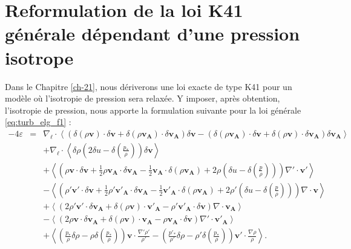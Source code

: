 \section{Reformulation de la loi \acs{K41} générale dépendant d'une pression isotrope}
\label{sec-132}

Dans le Chapitre \ref{ch-21}, nous dériverons une loi exacte de type \acs{K41} pour un modèle où l'isotropie de pression sera relaxée. Y imposer, après obtention, l'isotropie de pression, nous apporte la formulation suivante pour la loi générale \eqref{eq:turb_elg_f1} : 
\begin{equation}
\boxed{
\begin{array}{lcl}
\label{eq:turb_elg_f2}-4\varepsilon &=& \nabla_{\boldsymbol{\ell}} \cdot \left<\left(\delta \left(\rho\boldsymbol{v}\right) \cdot \delta \boldsymbol{v}+ \delta \left(\rho\boldsymbol{v_A}\right) \cdot \delta \boldsymbol{v_A}\right) \delta \boldsymbol{v}  -\left(\delta \left(\rho\boldsymbol{v_A}\right) \cdot \delta \boldsymbol{v}  + \delta \left(\rho\boldsymbol{v}\right) \cdot \delta \boldsymbol{v_A}  \right) \delta \boldsymbol{v_A} \right>\\
&& + \nabla_{\boldsymbol{\ell}} \cdot \left<\delta \rho  \left(2\delta u - \delta \left(\frac{p_*}{\rho}\right)\right)\delta \boldsymbol{v}\right> \\
&& +\left< \left(\rho \boldsymbol{v} \cdot \delta \boldsymbol{v} +\frac{1}{2} \rho \boldsymbol{v_A} \cdot \delta \boldsymbol{v_A} -\frac{1}{2} \boldsymbol{v_A} \cdot \delta \left(\rho \boldsymbol{v_A}\right) + 2\rho \left(\delta u - \delta \left(\frac{p}{\rho}\right)\right) \right) \nabla' \cdot \boldsymbol{v'} \right>\\
&& -\left<\left( \rho' \boldsymbol{v'} \cdot \delta \boldsymbol{v} +\frac{1}{2} \rho' \boldsymbol{v'_A} \cdot \delta \boldsymbol{v_A} -\frac{1}{2} \boldsymbol{v'_A} \cdot \delta \left(\rho \boldsymbol{v_A}\right) + 2\rho' \left(\delta u - \delta \left(\frac{p}{\rho}\right)\right)  \right)\nabla \cdot \boldsymbol{v}\right>\\
&&+ \left<\left(2 \rho' \boldsymbol{v'} \cdot \delta \boldsymbol{v_A}+ \delta\left(\rho \boldsymbol{v}\right) \cdot \boldsymbol{v'_A} - \rho' \boldsymbol{v'_A} \cdot \delta \boldsymbol{v}  \right)\nabla \cdot \boldsymbol{v_A}\right>\\
&&- \left<\left(2\rho \boldsymbol{v} \cdot \delta \boldsymbol{v_A} + \delta\left(\rho \boldsymbol{v}\right) \cdot \boldsymbol{v_A} - \rho \boldsymbol{v_A} \cdot \delta \boldsymbol{v}  \right)\nabla' \cdot \boldsymbol{v'_A}\right> \\
&&+  \left< \left(\frac{p_*}{\rho} \delta \rho - \rho \delta \left(\frac{p_*}{\rho}\right)  \right)\boldsymbol{v} \cdot \frac{\nabla' \rho'}{\rho'} - \left(\frac{p'_*}{\rho'} \delta \rho - \rho' \delta \left(\frac{p_*}{\rho}\right)  \right)  \boldsymbol{v'} \cdot \frac{\nabla \rho}{\rho} \right>.
\end{array}}
\end{equation} 
